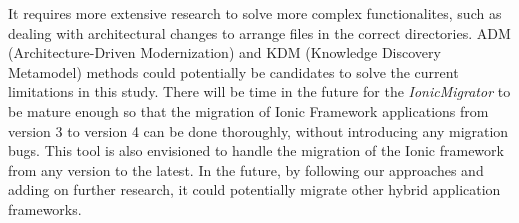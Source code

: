\documentclass[conference]{IEEEtran}
\begin{document}
It requires more extensive research to solve more complex functionalites, such as dealing with
architectural changes to arrange files in the correct directories. ADM (Architecture-Driven Modernization) and
KDM (Knowledge Discovery Metamodel) methods \cite{b6} \cite{b10} could potentially be candidates to solve the
current limitations in this study.
\newline
There will be time in the future for the \textit{IonicMigrator} to be mature enough so that the migration of Ionic Framework applications
from version  3 to version 4 can be done thoroughly, without introducing any migration bugs.
This tool is also envisioned to handle the migration of the Ionic framework from
any version to the latest. In the future, by following our approaches and adding on further research,
it could potentially migrate other hybrid application frameworks.
\end{document}
